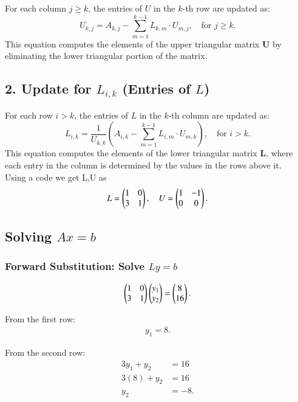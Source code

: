 \documentclass[journal,12pt,onecolumn]{IEEEtran}
\theoremstyle{remark}
\begin{document}
For each column $ j \geq k $, the entries of $ U $ in the $ k $-th row are updated as:
\[
U_{k,j} = A_{k,j} - \sum_{m=1}^{k-1} L_{k,m} \cdot U_{m,j}, \quad \text{for } j \geq k.
\]
This equation computes the elements of the upper triangular matrix $ \mathbf{U} $ by eliminating the lower triangular portion of the matrix.

\subsection*{2. Update for $ L_{i,k} $ (Entries of $ L $)}

For each row $ i > k $, the entries of $ L $ in the $ k $-th column are updated as:
\[
L_{i,k} = \frac{1}{U_{k,k}} \left( A_{i,k} - \sum_{m=1}^{k-1} L_{i,m} \cdot U_{m,k} \right), \quad \text{for } i > k.
\]
This equation computes the elements of the lower triangular matrix $ \mathbf{L} $, where each entry in the column is determined by the values in the rows above it.\\
Using a code we get L,U as 
\begin{align}
L = \begin{pmatrix}1 & 0 \\ 3 & 1\end{pmatrix}, \quad
U = \begin{pmatrix}1 & -1 \\ 0 & 0\end{pmatrix}.
\end{align}

\subsection*{Solving $A{x} = {b}$}

\subsubsection*{Forward Substitution: Solve $Ly = b$}
\begin{align}
\begin{pmatrix}1 & 0 \\ 3 & 1\end{pmatrix}
\begin{pmatrix}y_1 \\ y_2\end{pmatrix}
=
\begin{pmatrix}8 \\ 16\end{pmatrix}.
\end{align}

From the first row:
\begin{align}
y_1 = 8.
\end{align}

From the second row:
\begin{align}
3y_1 + y_2 &= 16 \\
3(8) + y_2 &= 16 \\
y_2 &= -8.
\end{align}
\end{document}
